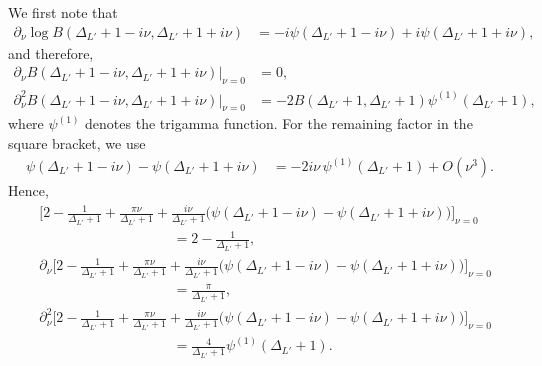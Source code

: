 \documentclass[11pt]{article}
\newcommand{\p}{\partial}
\newcommand{\nn}{\nonumber}
\begin{document}
We first note that
\begin{align}
    \p_\nu \log B(\Delta_{L'}+1-i\nu,\Delta_{L'}+1+i\nu)
    &=
    -i\psi(\Delta_{L'}+1-i\nu)
    +i\psi(\Delta_{L'}+1+i\nu),
\end{align}
and therefore,
\begin{align}
    \p_\nu B(\Delta_{L'}+1-i\nu,\Delta_{L'}+1+i\nu)\Big|_{\nu=0}
    &=0,
    \\
    \p_\nu^2 B(\Delta_{L'}+1-i\nu,\Delta_{L'}+1+i\nu)\Big|_{\nu=0}
    &=
    -2B(\Delta_{L'}+1,\Delta_{L'}+1)
    \psi^{(1)}(\Delta_{L'}+1),
\end{align}
where $\psi^{(1)}$ denotes the trigamma function.
For the remaining factor in the square bracket, we use
\begin{align}
    \psi(\Delta_{L'}+1-i\nu)
    -
    \psi(\Delta_{L'}+1+i\nu)
    &=
    -2i\nu\,\psi^{(1)}(\Delta_{L'}+1)
    +O(\nu^3).
\end{align}
Hence,
\begin{align}
    &\Bigg[
    2-\frac{1}{\Delta_{L'}+1}
    +\frac{\pi\nu}{\Delta_{L'}+1}
    +\frac{i\nu}{\Delta_{L'}+1}
    \Big(
    \psi(\Delta_{L'}+1-i\nu)
    -\psi(\Delta_{L'}+1+i\nu)
    \Big)
    \Bigg]_{\nu=0}
    \nn\\
    &\hspace{4cm}
    =
    2-\frac{1}{\Delta_{L'}+1},
    \\
    &\p_\nu\Bigg[
    2-\frac{1}{\Delta_{L'}+1}
    +\frac{\pi\nu}{\Delta_{L'}+1}
    +\frac{i\nu}{\Delta_{L'}+1}
    \Big(
    \psi(\Delta_{L'}+1-i\nu)
    -\psi(\Delta_{L'}+1+i\nu)
    \Big)
    \Bigg]_{\nu=0}
    \nn\\
    &\hspace{4cm}
    =
    \frac{\pi}{\Delta_{L'}+1},
    \\
    &\p_\nu^2\Bigg[
    2-\frac{1}{\Delta_{L'}+1}
    +\frac{\pi\nu}{\Delta_{L'}+1}
    +\frac{i\nu}{\Delta_{L'}+1}
    \Big(
    \psi(\Delta_{L'}+1-i\nu)
    -\psi(\Delta_{L'}+1+i\nu)
    \Big)
    \Bigg]_{\nu=0}
    \nn\\
    &\hspace{4cm}
    =
    \frac{4}{\Delta_{L'}+1}
    \psi^{(1)}(\Delta_{L'}+1).
\end{align}
\end{document}
